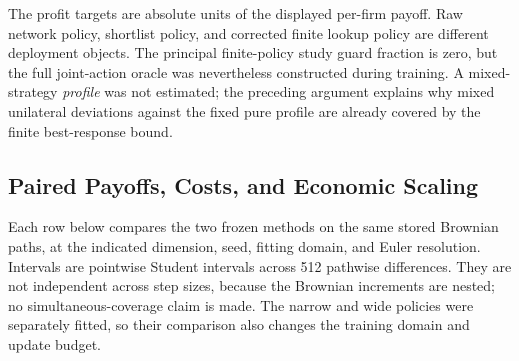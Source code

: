 The profit targets are absolute units of the displayed per-firm payoff. Raw network policy, shortlist policy, and corrected finite lookup policy are different deployment objects. The principal finite-policy study guard fraction is zero, but the full joint-action oracle was nevertheless constructed during training. A mixed-strategy \emph{profile} was not estimated; the preceding argument explains why mixed unilateral deviations against the fixed pure profile are already covered by the finite best-response bound.

\subsection{Paired Payoffs, Costs, and Economic Scaling}\label{supp:r8-paired}
Each row below compares the two frozen methods on the same stored Brownian paths, at the indicated dimension, seed, fitting domain, and Euler resolution. Intervals are pointwise Student intervals across 512 pathwise differences. They are not independent across step sizes, because the Brownian increments are nested; no simultaneous-coverage claim is made. The narrow and wide policies were separately fitted, so their comparison also changes the training domain and update budget.


